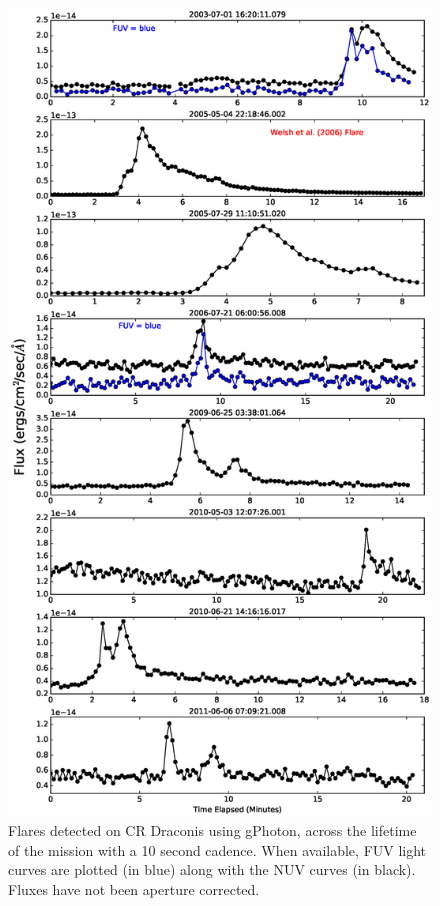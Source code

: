 \documentclass[preprint]{aastex}
\begin{document}
\clearpage

\begin{figure}
\includegraphics[scale=0.375]{Fig19.eps}
\caption{Flares detected on CR Draconis using gPhoton, across the lifetime of the mission with a 10 second cadence. When available, FUV light curves are plotted (in blue) along with the NUV curves (in black). Fluxes have not been aperture corrected. \label{crdraflares}}
\end{figure}
\end{document}
